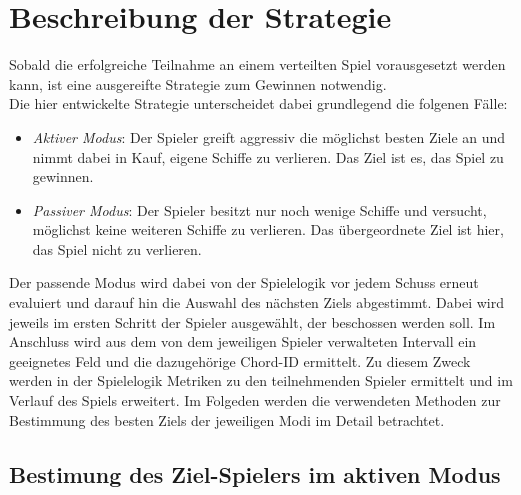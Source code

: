 
\section{Beschreibung der Strategie}

Sobald die erfolgreiche Teilnahme an einem verteilten Spiel vorausgesetzt werden kann, ist eine ausgereifte Strategie zum Gewinnen notwendig.\\ Die hier entwickelte Strategie unterscheidet dabei grundlegend die folgenen Fälle:

\begin{itemize}
\item \textit{Aktiver Modus}: Der Spieler greift aggressiv die möglichst besten Ziele an und nimmt dabei in Kauf, eigene Schiffe zu verlieren. Das Ziel ist es, das Spiel zu gewinnen.
\item \textit{Passiver Modus}: Der Spieler besitzt nur noch wenige Schiffe und versucht, möglichst keine weiteren Schiffe zu verlieren. Das übergeordnete Ziel ist hier, das Spiel nicht zu verlieren.
\end{itemize}

Der passende Modus wird dabei von der Spielelogik vor jedem Schuss erneut evaluiert und darauf hin die Auswahl des nächsten Ziels abgestimmt. Dabei wird jeweils im ersten Schritt der Spieler ausgewählt, der beschossen werden soll. Im Anschluss wird aus dem von dem jeweiligen Spieler verwalteten Intervall ein geeignetes Feld und die dazugehörige Chord-ID ermittelt. Zu diesem Zweck werden in der Spielelogik Metriken zu den teilnehmenden Spieler ermittelt und im Verlauf des Spiels erweitert. Im Folgeden werden die verwendeten Methoden zur Bestimmung des besten Ziels der jeweiligen Modi im Detail betrachtet.\\

\subsection{Bestimung des Ziel-Spielers im aktiven Modus}

